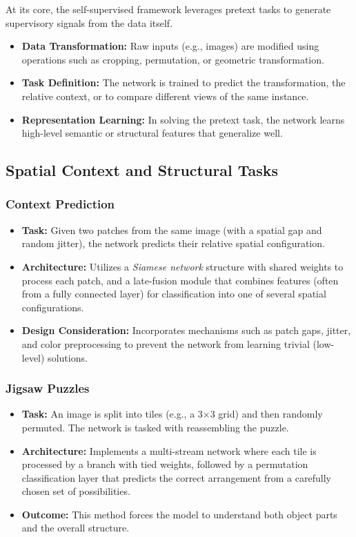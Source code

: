 \documentclass{article}
\begin{document}
At its core, the self-supervised framework leverages pretext tasks to generate supervisory signals from the data itself.

\begin{itemize}
    \item \textbf{Data Transformation:} Raw inputs (e.g., images) are modified using operations such as cropping, permutation, or geometric transformation.
    \item \textbf{Task Definition:} The network is trained to predict the transformation, the relative context, or to compare different views of the same instance.
    \item \textbf{Representation Learning:} In solving the pretext task, the network learns high-level semantic or structural features that generalize well.
\end{itemize}

\subsection{Spatial Context and Structural Tasks}
\subsubsection{Context Prediction}
\begin{itemize}
    \item \textbf{Task:} Given two patches from the same image (with a spatial gap and random jitter), the network predicts their relative spatial configuration.
    \item \textbf{Architecture:} Utilizes a \emph{Siamese network} structure with shared weights to process each patch, and a late-fusion module that combines features (often from a fully connected layer) for classification into one of several spatial configurations.
    \item \textbf{Design Consideration:} Incorporates mechanisms such as patch gaps, jitter, and color preprocessing to prevent the network from learning trivial (low-level) solutions.
\end{itemize}

\subsubsection{Jigsaw Puzzles}
\begin{itemize}
    \item \textbf{Task:} An image is split into tiles (e.g., a 3$\times$3 grid) and then randomly permuted. The network is tasked with reassembling the puzzle.
    \item \textbf{Architecture:} Implements a multi-stream network where each tile is processed by a branch with tied weights, followed by a permutation classification layer that predicts the correct arrangement from a carefully chosen set of possibilities.
    \item \textbf{Outcome:} This method forces the model to understand both object parts and the overall structure.
\end{itemize}
\end{document}
